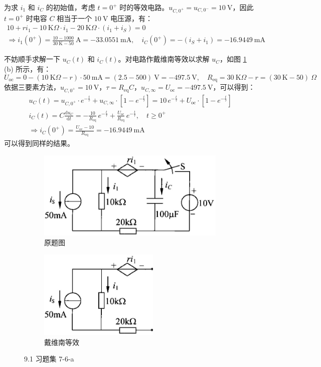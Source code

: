 \documentclass[UTF8]{report}
\def\K{\ \mathrm{K}}
\def\mA{\ \mathrm{mA}}
\def\kO{\ \mathrm{K}\Omega}
\def\KO{\ \mathrm{K}\Omega}
\theoremstyle{MyLineTheoremStyle} %
\theoremstyle{MyBlockTheoremStyle} %
\theoremstyle{MySubsubsectionStyle} %
\begin{document}
为求 $i_1$ 和 $i_C$ 的初始值，考虑 $t = 0^+$ 时的等效电路。$u_{C, 0^+} = u_{C, 0^-} = 10 \ \mathrm{V}$，因此 $t = 0^+$ 时电容 $C$ 相当于一个 $10 \ \mathrm{V}$ 电压源，有：
\begin{gather}
10 + ri_1 - 10 \KO \cdot i_1 - 20\kO \cdot (i_1 + i_S) = 0 \\
\Longrightarrow 
\boxed{
    i_1(0^+) = \frac{10 - 1000}{30\K - 50} \ \mathrm{A} = -33.0551 \mA,\quad i_C(0^+) = -(i_S + i_1) =  -16.9449 \mA
}
\end{gather}

不妨顺手求解一下 $u_C(t)$ 和 $i_C(t)$。对电路作戴维南等效以求解 $u_C$，如图 \ref{9.1 习题集 7-6} (b) 所示，有：
\begin{equation}
U_{\text{oc}} =  0 - (10 \kO - r)\cdot 50\mA = (2.5 - 500) \ \mathrm{V} = - 497.5 \ \mathrm{V},\quad R_{\text{eq}} = 30\kO - r = (30\K - 50) \ \Omega
\end{equation}
依据三要素方法，$u_{C, 0^+} = 10 \ \mathrm{V}$，$\tau = R_{\text{eq}}C$，$u_{C,\infty} = U_{\text{oc}} = - 497.5 \ \mathrm{V}$，可以得到：
\begin{gather}
u_C (t) = u_{C, 0^+}\cdot e^{-\frac{t}{\tau}} + u_{C,\infty}\cdot \left[1 - e^{-\frac{t}{\tau}}\right] = 10 \,e^{-\frac{t}{\tau}} +  U_{\text{oc}}\cdot \left[1 - e^{-\frac{t}{\tau}}\right] \\ 
i_C (t) = C\frac{\mathrm{d} u_C }{\mathrm{d} t }
= -\frac{10}{R_{\text{eq}}} \,e^{-\frac{t}{\tau}} + \frac{U_{\text{oc}}}{R_{\text{eq}}} \,e^{-\frac{t}{\tau}},\quad t \geqslant 0^+ \\ 
\Longrightarrow i_C (0^+) = \frac{U_{\text{oc}} - 10}{R_{\text{eq}}} = -16.9449 \mA
\end{gather}
可以得到同样的结果。

\begin{figure}[H]\centering
\begin{subfigure}[b]{0.5\columnwidth}\centering
    \includegraphics[height=120pt]{assets/9/9.1 (a).png}
    \caption{原题图}
\end{subfigure}\hfill
\begin{subfigure}[b]{0.5\columnwidth}\centering
    \includegraphics[height=120pt]{assets/9/9.1 (b).png}
    \caption{戴维南等效}
\end{subfigure}
\caption{9.1 习题集 7-6-a}
\label{9.1 习题集 7-6}
\end{figure}
\end{document}
